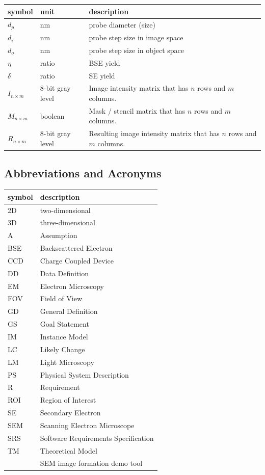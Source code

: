 \documentclass[12pt]{article}
\begin{document}
\renewcommand{\arraystretch}{1.2}
\noindent \begin{longtable*}{l l p{12cm}} \toprule
\textbf{symbol} & \textbf{unit} & \textbf{description}\\
\midrule 
$d_p$ & \si[per-mode=symbol] {\nm} & probe diameter (size)\\
$d_i$ & \si[per-mode=symbol] {\nm} & probe step size in image space\\
$d_o$ & \si[per-mode=symbol] {\nm} & probe step size in object space\\
$\eta$ & ratio & BSE yield \\
$\delta$ & ratio & SE yield \\
$I_{n\times m}$ & 8-bit gray level & Image intensity matrix that has $n$ rows and $m$ columns.\\
$M_{n\times m}$ & boolean & Mask / stencil matrix that has $n$ rows and $m$ columns.\\
$R_{n\times m}$ & 8-bit gray level & Resulting image intensity matrix that has $n$ rows and $m$ columns.\\
\bottomrule
\end{longtable*}

\subsection{Abbreviations and Acronyms}

\renewcommand{\arraystretch}{1.2}
\begin{tabular}{l l} 
  \toprule		
  \textbf{symbol} & \textbf{description}\\
  \midrule 
  2D & two-dimensional\\
  3D & three-dimensional\\
  A & Assumption\\
  BSE & Backscattered Electron\\
  CCD & Charge Coupled Device\\
  DD & Data Definition\\
  EM & Electron Microscopy\\
  FOV & Field of View\\
  GD & General Definition\\
  GS & Goal Statement\\
  IM & Instance Model\\
  LC & Likely Change\\
  LM & Light Microscopy\\
  PS & Physical System Description\\
  R & Requirement\\
  ROI & Region of Interest\\
  SE & Secondary Electron\\
  SEM & Scanning Electron Microscope\\
  SRS & Software Requirements Specification\\
  TM & Theoretical Model\\
  \progname{} & SEM image formation demo tool\\
  \bottomrule
\end{tabular}\\
\end{document}
